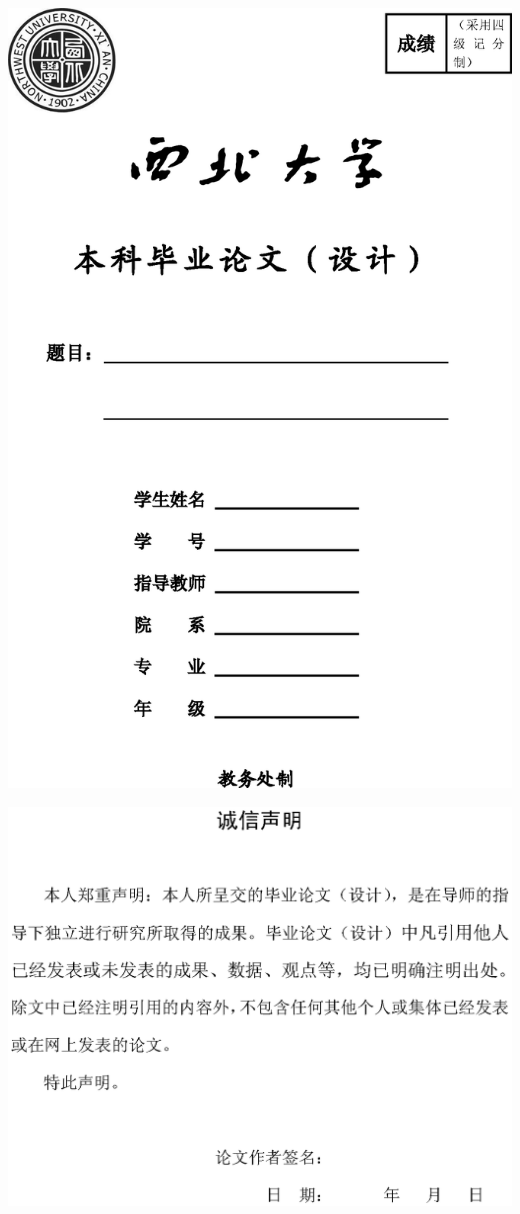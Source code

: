 \thispagestyle{empty}
\begin{center}
\includegraphics{titlepage/titlepage.eps}
\end{center}
\cleardoublepage

\thispagestyle{empty}
\begin{center}
\includegraphics{titlepage/credit.eps}
\end{center}
\cleardoublepage
